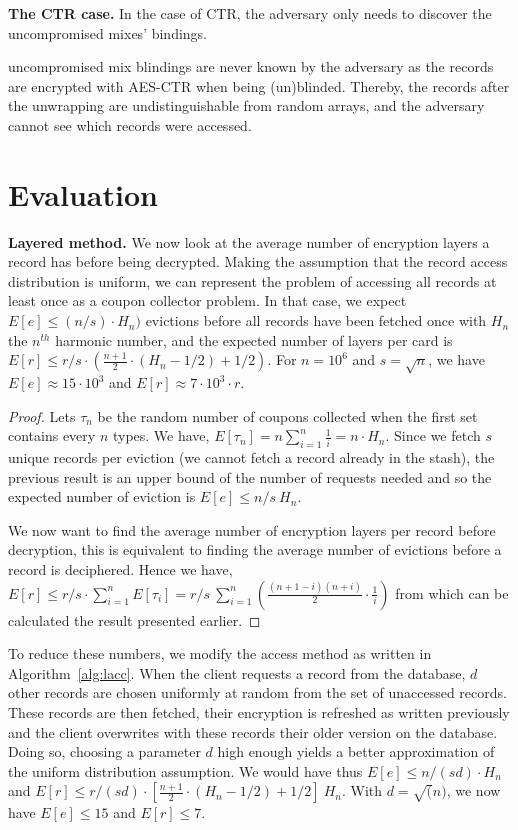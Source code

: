 \documentclass[USenglish,oneside,twocolumn]{article}
\begin{document}
\noindent\textbf{The CTR case.}
In the case of CTR, the adversary only needs to discover the uncompromised mixes' bindings. 

uncompromised mix blindings are never known by the adversary as the records are encrypted with AES-CTR when being (un)blinded. Thereby, the records after the unwrapping are undistinguishable from random arrays, and the adversary cannot see which records were accessed.

\section{Evaluation}\label{Evaluation}
\textbf{Layered method.} We now look at the average number of encryption layers a record has before being decrypted. Making the assumption that the record access distribution is uniform, we can represent the problem of accessing all records at least once as a coupon collector problem. In that case, we expect $E[e]\leq(n/s)\cdot H_n )$ evictions before all records have been fetched once with $H_n$ the $n^{th}$ harmonic number, and the expected number of layers per card is $E[r]\leq{r/s} \cdot \left ( \frac{n+1}{2}\cdot(H_n-1/2)+1/2 \right )$. For $n=10^6$ and $s=\sqrt{n}$, we have $E[e]\approx 15 \cdot 10^3$ and $E[r]\approx 7\cdot 10^3 \cdot r$.
\begin{proof}
Lets $\tau_n$ be the random number of coupons collected when the first set contains every $n$ types. We have, $E[\tau_n]=n\sum_{i=1}^n \frac{1}{i} = n \cdot H_n$.
Since we fetch $s$ unique records per eviction (we cannot fetch a record already in the stash), the previous result is an upper bound of the number of requests needed and so the expected number of eviction is $E[e]\leq n/s\ H_n$.

We now want to find the average number of encryption layers per record before decryption, this is equivalent to finding the average number of evictions before a record is deciphered. 
Hence we have, $E[r]\leq r/s \cdot \sum_{i=1}^n E[\tau_i] = r/s\ \sum_{i=1}^n \left (\frac{(n+1-i)(n+i)}{2}\cdot \frac{1}{i}\right )$ from which can be calculated the result presented earlier. 
\end{proof}

To reduce these numbers, we modify the access method as written in Algorithm~\ref{alg:lacc}. When the client requests a record from the database, $d$ other records are chosen uniformly at random from the set of unaccessed records. These records are then fetched, their encryption is refreshed as written previously and the client overwrites with these records their older version on the database. Doing so, choosing a parameter $d$ high enough yields a better approximation of the uniform distribution assumption. We would have thus $E[e]\leq n/(sd) \cdot H_n $ and $E[r] \leq{r/(sd)} \cdot \left [ \frac{n+1}{2}\cdot(H_n-1/2)+1/2 \right ] \ H_n$.
With $d=\sqrt(n)$, we now have $E[e]\leq 15$ and $E[r]\leq 7$.
\end{document}
